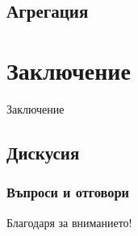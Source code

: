 \documentclass{beamer}
\begin{document}
\subsection{Агрегация}

\begin{frame}
\frametitle{}
\begin{block}{}
\end{block}
\end{frame}

\section{Заключение}

\begin{frame}
\center \huge{Заключение}
\end{frame}

\subsection{Дискусия}

\begin{frame}
\frametitle{Въпроси и отговори}
\center \huge{Благодаря за вниманието!}
\end{frame}
\end{document}
